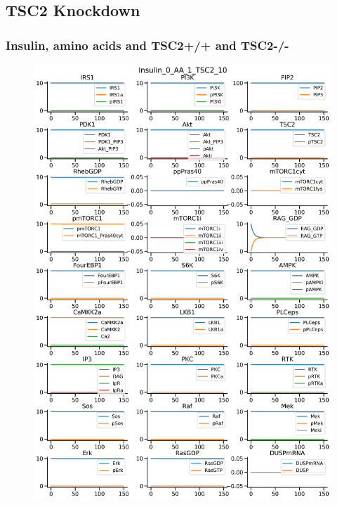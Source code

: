 \documentclass{beamer}
\begin{document}
\subsection{TSC2 Knockdown} %
\begin{frame}
\frametitle{Insulin, amino acids and TSC2+/+ and TSC2-/-}
\begin{figure}
    \begin{minipage}{0.45\textwidth}
        \centering
        \includegraphics[width=\textwidth]{../simulations/ExtendedPI3KModel/validations/AAWithInsulinAndTSC2KO/Insulin_0_AA_1_TSC2_10-1.png}
    \end{minipage}
    \begin{minipage}{0.45\textwidth}

\end{minipage}
\end{figure}
\end{frame}
\end{document}
